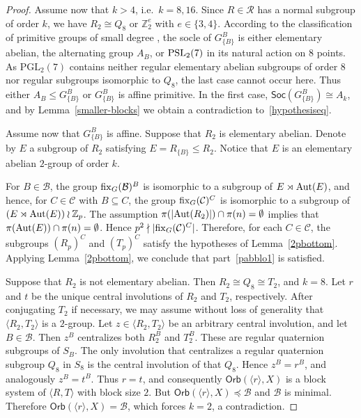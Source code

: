 \documentclass[11pt]{amsart}
\numberwithin{equation}{section}
\theoremstyle{definition}
\newcounter{case}
\def\PSL{{\rm PSL}}
\def\fix{{\rm fix}}
\def\Aut{{\rm Aut}}
\def\Z{{\mathbb Z}}
\def\soc{{\mathsf{Soc}}}
\begin{document}
\begin{proof}
		Assume now that $k > 4$, i.e.\ $k = 8,16$.  
		Since $R \in {\mathcal R}$ has a normal subgroup of order $k$, we have  
		$R_{2} \cong Q_{8}$ or $\Z_{2}^{e}$ with $e \in \{3,4\}$.  
		According to the classification of primitive groups of small degree \cite{DixonM1996},  
		the socle of $G_{\{B\}}^{B}$ is either elementary abelian, the alternating group $A_{B}$,  
		or $\PSL_{2}(7)$ in its natural action on $8$ points.  
		As $\mathrm{PGL}_{2}(7)$ contains neither regular elementary abelian subgroups of order $8$  
		nor regular subgroups isomorphic to $Q_{8}$, the last case cannot occur here.  
		Thus either $A_{B} \le G_{\{B\}}^{B}$ or $G_{\{B\}}^{B}$ is affine primitive.  
		In the first case, $\soc(G_{\{B\}}^{B}) \cong A_{k}$, and by Lemma~\ref{smaller-blocks}  
		we obtain a contradiction to~\eqref{hypothesiseq}.
		
		Assume now that $G_{\{B\}}^{B}$ is affine.  
		Suppose that $R_{2}$ is elementary abelian.  Denote by $E$ a subgroup of  $R_2$ satisfying $E = R_{\{B\}} \leq R_{2}$. Notice that $E$ is an elementary abelian $2$-group of order $k$.
		 
		For $B \in {\mathcal B}$, the group $\fix_{G}({\mathcal B})^{B}$ is isomorphic  
		to a subgroup of $E \rtimes \Aut(E)$, and hence, for  
		$C \in {\mathcal C}$ with $B \subseteq C$, the group  
		$\fix_{G}({\mathcal C})^{C}$ is isomorphic to a subgroup of  
		$
		(E \rtimes \Aut(E)) \wr \Z_{p}$.
		The assumption $\pi(|\Aut(R_{2})|) \cap \pi(n) = \emptyset$ implies that $\pi(\Aut(E))\cap\pi(n)=\emptyset$. Hence  
		$p^{2} \nmid |\fix_{G}({\mathcal C})^{C}|$.  
		Therefore, for each $C \in {\mathcal C}$, the subgroups $(R_{p})^{C}$  
		and $(T_{p})^{C}$ satisfy the hypotheses of Lemma~\ref{2pbottom}.  
		Applying Lemma~\ref{2pbottom}, we conclude that part~\eqref{pabblo1} is satisfied.
		
		
		
		Suppose that $R_{2}$ is not elementary abelian.  
		Then $R_{2} \cong Q_{8} \cong T_{2}$, and $k = 8$.  
		Let $r$ and $t$ be the unique central involutions of $R_{2}$ and $T_{2}$, respectively.  
		After conjugating $T_{2}$ if necessary, we may assume without loss of generality that  
		$\langle R_{2}, T_{2} \rangle$ is a $2$-group.  
		Let $z \in \langle R_{2}, T_{2} \rangle$ be an arbitrary central involution,  
		and let $B \in {\mathcal B}$.  
		Then $z^{B}$ centralizes both $R_{2}^{B}$ and $T_{2}^{B}$.  
		These are regular quaternion subgroups of $S_{B}$.  
		The only involution that centralizes a regular quaternion subgroup $Q_{8}$ in $S_{8}$  
		is the central involution of that $Q_{8}$.  
		Hence $z^{B} = r^{B}$, and analogously $z^{B} = t^{B}$.  
		Thus $r = t$, and consequently $\mathsf{Orb}(\langle r\rangle, X)$  
		is a block system of $\langle R, T\rangle$ with block size $2$.  
		But $\mathsf{Orb}(\langle r\rangle,X) \preceq {\mathcal B}$ and ${\mathcal B}$ is minimal.  
		Therefore $\mathsf{Orb}(\langle r\rangle,X) = {\mathcal B}$, which forces $k = 2$,  
		a contradiction.
	\end{proof}
	
\end{document}
